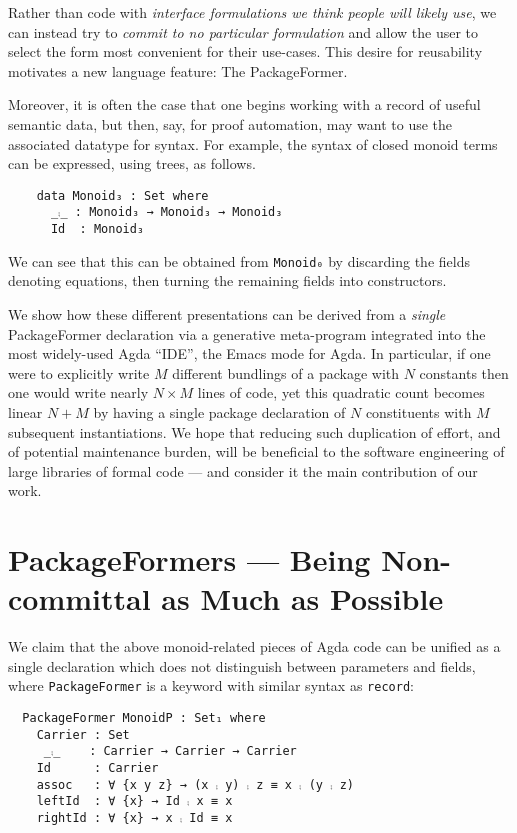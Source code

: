\documentclass[sigplan,screen]{acmart}
\begin{document}
Rather than code with \emph{interface formulations we think people will likely use}, we can
instead try to \emph{commit to no particular formulation} and allow the user to select
the form most convenient for their use-cases. This desire for reusability motivates
a new language feature: The \textsf{\upshape PackageFormer}.

Moreover, it is often the case that one begins working with a record of useful
semantic data, but then, say, for proof automation, may want to use the associated
datatype for syntax. For example, the syntax of closed monoid terms can be expressed,
using trees, as follows.
\begin{verbatim}
    data Monoid₃ : Set where
      _⨾_ : Monoid₃ → Monoid₃ → Monoid₃
      Id  : Monoid₃
\end{verbatim}
\noindent
We can see that this can be
obtained from \texttt{Monoid₀} by discarding the
fields denoting equations, then turning the remaining fields into constructors.

We show how these different
presentations can be derived from a \emph{single}
\textsf{\upshape PackageFormer} declaration
via a generative meta-program integrated into the
most widely-used Agda “IDE”, the Emacs mode for Agda.
In particular,
if one were to explicitly write \(M\) different bundlings of a package
with \(N\) constants then one would write nearly \(N × M\) lines of code,
yet this quadratic count becomes linear \(N + M\) by having a single
package declaration of \(N\) constituents with \(M\) subsequent instantiations.
We hope that reducing such duplication of effort, and of potential maintenance
burden, will be beneficial to the software engineering of large libraries
of formal code --- and consider it the main contribution of our work.

\section{\textsf{\upshape PackageFormer}s --- Being Non-committal as Much as Possible}
\label{sec:org6adef27}
We claim that the above monoid-related pieces of Agda code
can be unified as a single declaration
which does not distinguish between parameters and fields,
where \texttt{PackageFormer} is a keyword with similar syntax as \texttt{record}:

\begin{verbatim}
  PackageFormer MonoidP : Set₁ where
    Carrier : Set
     _⨾_    : Carrier → Carrier → Carrier
    Id      : Carrier
    assoc   : ∀ {x y z} → (x ⨾ y) ⨾ z ≡ x ⨾ (y ⨾ z)
    leftId  : ∀ {x} → Id ⨾ x ≡ x
    rightId : ∀ {x} → x ⨾ Id ≡ x
\end{verbatim}
\end{document}
